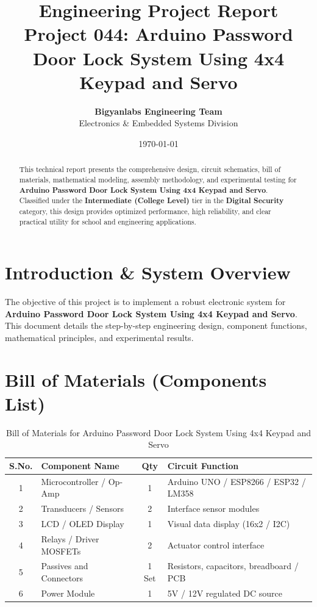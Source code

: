 \documentclass[11pt,a4paper]{article}
\title{\textbf{\Huge Engineering Project Report}\\[0.5em] \Large Project 044: Arduino Password Door Lock System Using 4x4 Keypad and Servo}
\author{\textbf{Bigyanlabs Engineering Team}\\ Electronics \& Embedded Systems Division}
\date{\today}
\begin{document}
\maketitle
\thispagestyle{empty}

\begin{abstract}
This technical report presents the comprehensive design, circuit schematics, bill of materials, mathematical modeling, assembly methodology, and experimental testing for \textbf{Arduino Password Door Lock System Using 4x4 Keypad and Servo}. Classified under the \textbf{Intermediate (College Level)} tier in the \textbf{Digital Security} category, this design provides optimized performance, high reliability, and clear practical utility for school and engineering applications.
\end{abstract}

\newpage
\tableofcontents
\newpage

\section{Introduction \& System Overview}
The objective of this project is to implement a robust electronic system for \textbf{Arduino Password Door Lock System Using 4x4 Keypad and Servo}. This document details the step-by-step engineering design, component functions, mathematical principles, and experimental results.

\section{Bill of Materials (Components List)}
\begin{table}[h!]
\centering
\caption{Bill of Materials for Arduino Password Door Lock System Using 4x4 Keypad and Servo}
\vspace{0.5em}
\begin{tabular}{clcp{7cm}}
\toprule
\textbf{S.No.} & \textbf{Component Name} & \textbf{Qty} & \textbf{Circuit Function} \\
\midrule
1 & Microcontroller / Op-Amp & 1 & Arduino UNO / ESP8266 / ESP32 / LM358 \\
2 & Transducers / Sensors & 2 & Interface sensor modules \\
3 & LCD / OLED Display & 1 & Visual data display (16x2 / I2C) \\
4 & Relays / Driver MOSFETs & 2 & Actuator control interface \\
5 & Passives and Connectors & 1 Set & Resistors, capacitors, breadboard / PCB \\
6 & Power Module & 1 & 5V / 12V regulated DC source \\
\bottomrule
\end{tabular}
\end{table}
\end{document}
